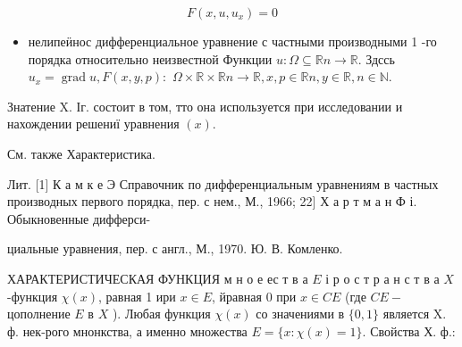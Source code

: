 \documentclass[10pt]{article}
\begin{document}
\[

F\left(x, u, u_{x}\right)=0

\]



\begin{itemize}

  \item нелипеӥнос дифференциальное уравнение с частными производными 1 -го порядка относительно неизвестной Функции $u: \Omega \subseteq \mathbb{R} n \longrightarrow \mathbb{R}$. Здссь $u_{x}=\operatorname{grad} u, F(x, y, p):$ $\Omega \times \mathbb{R} \times \mathbb{R} n \longrightarrow \mathbb{R}, x, p \in \mathbb{R} n, y \in \mathbb{R}, n \in \mathbb{N}$.

\end{itemize}



Знатение X. Іг. состоит в том, тто она используется при исследовании и нахождении решениї уравнения $(x)$.



См. также Характеристика.



Лит. [1] К а м к е Э Справочник по дифференциальным уравнениям в частных производных первого порядка, пер. с нем., М., 1966; 22] Х а р т м а н Ф і. Обыкновенные дифферси-

циальные уравнения, пер. с англ., М., 1970. Ю. В. Комленко.



ХАРАКТЕРИСТИЧЕСКАЯ ФУНКЦИЯ м н о е ес т в а $E$ і р о с т р а н с т в а $X$-функция $\chi(x)$, равная 1 ири $x \in E$, йравная 0 при $x \in C E$ (где $C E-$ цополнение $E$ в $X$ ). Любая функция $\chi(x)$ со значениями в $\{0,1\}$ является $\mathrm{X}$. ф. нек-рого мнонкства, а именно множества $E=\{x: \chi(x)=1\}$. Свойства Х. ф.:
\end{document}

